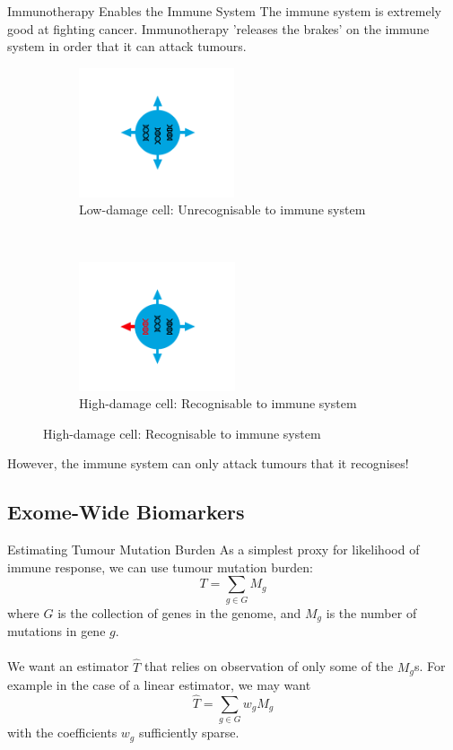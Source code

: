 \documentclass{beamer}
\begin{document}
\begin{frame}{Immunotherapy Enables the Immune System}
The immune system is extremely good at fighting cancer. Immunotherapy 'releases the brakes' on the immune system in order that it can attack tumours.
\begin{figure}[t!]
    \centering
    \begin{subfigure}[t]{0.45\textwidth}
        \centering
        \includegraphics[height=1.5in]{figures/IC1.png}
        \caption{Low-damage cell: Unrecognisable to immune system}
    \end{subfigure}
    ~ 
    \begin{subfigure}[t]{0.45\textwidth}
        \centering
        \includegraphics[height=1.5in]{figures/IC2.png}
        \caption{High-damage cell: Recognisable to immune system}
    \end{subfigure}
\end{figure}
However, the immune system can only attack tumours that it recognises!
\end{frame}

\subsection{Exome-Wide Biomarkers}

\begin{frame}{Estimating Tumour Mutation Burden}
As a simplest proxy for likelihood of immune response, we can use tumour mutation burden:
\[
T = \sum_{g \in G} M_g
\]
where $G$ is the collection of genes in the genome, and $M_g$ is the number of mutations in gene $g$. \\
~\\
We want an estimator $\hat{T}$ that relies on observation of only some of the $M_g$s. For example in the case of a linear estimator, we may want 
\[\hat{T} = \sum_{g \in G} w_g M_g \]
with the coefficients $w_g$ sufficiently sparse.
\end{frame}
\end{document}
